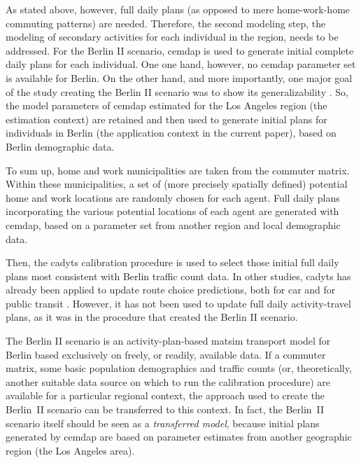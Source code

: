 As stated above, however, full daily plans (as opposed to mere home-work-home commuting patterns) are needed. Therefore, the second modeling step, the modeling of secondary activities for each individual in the region, needs to be addressed. For the Berlin II scenario, \gls{cemdap} is used to generate initial complete daily plans for each individual. One one hand, however, no \gls{cemdap} parameter set is available for Berlin. On the other hand, and more importantly, one major goal of the study creating the Berlin II scenario was to show its generalizability \citep{ZiemkeNagelBhat2015IntegratingCemdapMatsimTransferabilityTRB}. So, the model parameters of \gls{cemdap} estimated for the Los Angeles region (the estimation context) are retained and then used to generate initial plans for individuals in Berlin (the application context in the current paper), based on Berlin demographic data.

To sum up, home and work municipalities are taken from the commuter matrix. Within these municipalities, a set of (more precisely spatially defined) potential home and work locations are randomly chosen for each agent. Full daily plans incorporating the various potential locations of each agent are generated with \gls{cemdap}, based on a parameter set from another region and local demographic data.

Then, the \gls{cadyts} calibration procedure is used to select those initial full daily plans most consistent with Berlin traffic count data. In other studies, \gls{cadyts} has already been applied to update route choice predictions, both for car \citep{FloetteroedChenEtAl2011BehavioralCalibAndAnaNETS} and for public transit \citep{MoyoNagel2013ptNetCalibrationABMTPO}. However, it has not been used to update full daily activity-travel plans, as it was in the procedure that created the Berlin II scenario. 

The Berlin II scenario is an activity-plan-based \gls{matsim} transport model for Berlin based exclusively on freely, or readily, available data. If a commuter matrix, some basic population demographics and traffic counts (or, theoretically, another suitable data source on which to run the calibration procedure) are available for a particular regional context, the approach used to create the Berlin~II scenario can be transferred to this context. In fact, the Berlin~II scenario itself should be seen as a \emph{transferred model}, because initial plans generated by \gls{cemdap} are based on parameter estimates from another geographic region (the Los Angeles area).

